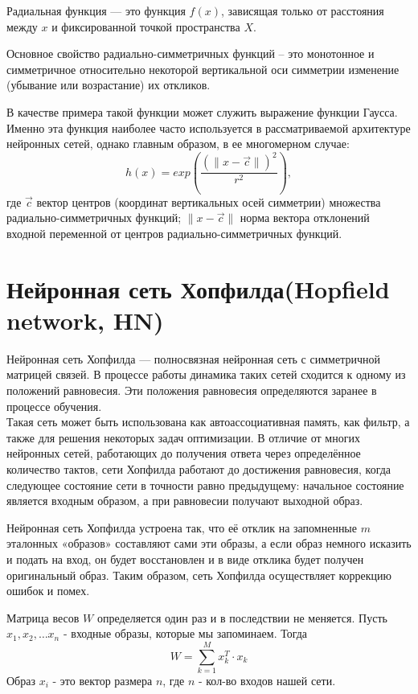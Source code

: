 \documentclass[paper=a4, fontsize=11pt]{scrartcl} %
\numberwithin{equation}{section} %
\numberwithin{figure}{section} %
\numberwithin{table}{section} %
\begin{document}
	Радиальная функция — это функция $f(x)$, зависящая только от расстояния между $x$ и фиксированной точкой пространства $X$. 
	
	Основное свойство радиально-симметричных функций – это монотонное и симметричное относительно некоторой вертикальной оси симметрии изменение (убывание или возрастание) их откликов.
	
	В качестве примера такой функции может служить выражение функции Гаусса. Именно эта функция наиболее часто используется в рассматриваемой архитектуре нейронных сетей, однако главным образом, в ее многомерном случае:
	$$h(x) = exp(\frac{(\|x - \vec{c}\|)^2}{r^2}),$$
	где $\vec{c}$ вектор центров (координат вертикальных осей симметрии) множества радиально-симметричных функций;  $\|x - \vec{c}\|$ норма вектора отклонений входной переменной от центров радиально-симметричных функций.
	
	
	\section{Нейронная сеть Хопфилда(Hopfield network, HN) }
	Нейронная сеть Хопфилда — полносвязная нейронная сеть с симметричной матрицей связей. В процессе работы динамика таких сетей сходится к одному из положений равновесия. Эти положения равновесия определяются заранее в процессе обучения. \\
	Такая сеть может быть использована как автоассоциативная память, как фильтр, а также для решения некоторых задач оптимизации. В отличие от многих нейронных сетей, работающих до получения ответа через определённое количество тактов, сети Хопфилда работают до достижения равновесия, когда следующее состояние сети в точности равно предыдущему: начальное состояние является входным образом, а при равновесии получают выходной образ.
	
	Нейронная сеть Хопфилда устроена так, что её отклик на запомненные $m$ эталонных «образов» составляют сами эти образы, а если образ немного исказить и подать на вход, он будет восстановлен и в виде отклика будет получен оригинальный образ. Таким образом, сеть Хопфилда осуществляет коррекцию ошибок и помех.
	
	Матрица весов $W$ определяется один раз и в последствии не меняется. Пусть $x_1, x_2, \ldots x_n$ - входные образы, которые мы запоминаем. Тогда
	$$W = \sum_{k = 1}^{M} x_k^T \cdot x_k$$
	Образ $x_i$ - это вектор размера $n$, где $n$ - кол-во входов нашей сети.
	
\end{document}
